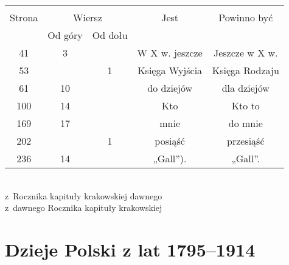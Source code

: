 \documentclass[a4paper,11pt]{article}
\begin{document}


\begin{center}

  \begin{tabular}{|c|c|c|c|c|}
    \hline
    & \multicolumn{2}{c|}{} & & \\
    Strona & \multicolumn{2}{c|}{Wiersz} & Jest
                              & Powinno być \\ \cline{2-3}
    & Od góry & Od dołu & & \\
    \hline
    41  &  3 & & W X w. jeszcze & Jeszcze w X w. \\
    53  & &  1 & Księga Wyjścia & Księga Rodzaju \\
    61  & 10 & & do dziejów & dla dziejów \\
    100 & 14 & & Kto & Kto to \\
    169 & 17 & & mnie & do mnie \\
    202 & &  1 & posiąść & przesiąść \\
    236 & 14 & & „Gall”). & „Gall”. \\
    \hline
  \end{tabular}

\end{center}


\noindent
{} \\
\Jest  z~Rocznika kapituły krakowskiej dawnego \\
\Powin z~dawnego Rocznika kapituły krakowskiej \\

\vspace{\spaceTwo}










\newpage
\section{Dzieje Polski z lat 1795--1914}

\vspace{\spaceTwo}



\end{document}
